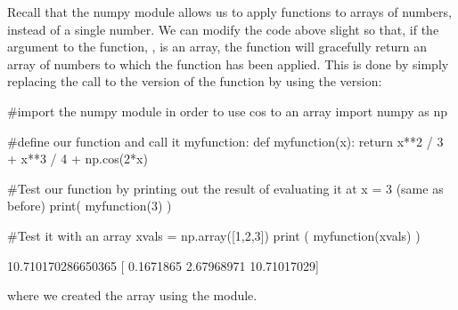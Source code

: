 Recall that the numpy module allows us to apply functions to arrays of numbers, instead of a single number. We can modify the code above slight so that, if the argument to the function, , is an array, the function will gracefully return an array of numbers to which the function has been applied. This is done by simply replacing the call to the  version of the  function by using the  version:
\begin{python}[caption=Defining a function that works on an array] 
#import the numpy module in order to use cos to an array
import numpy as np

#define our function and call it myfunction:
def myfunction(x):
  return x**2 / 3 + x**3 / 4 + np.cos(2*x)
  
#Test our function by printing out the result of evaluating it at x = 3 (same as before)
print( myfunction(3) )  

#Test it with an array
xvals = np.array([1,2,3])
print ( myfunction(xvals) )  

\end{python}
\begin{poutput}
10.710170286650365
[ 0.1671865   2.67968971 10.71017029]
\end{poutput}
where we created the array  using the  module.

